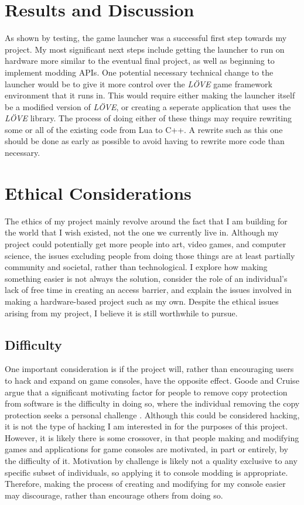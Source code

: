 \documentclass[10pt,twocolumn]{article}
\begin{document}
\section{Results and Discussion}

As shown by testing, the game launcher was a successful first step towards my
project. My most significant next steps include getting the launcher to run on
hardware more similar to the eventual final project, as well as beginning to
implement modding APIs. One potential necessary technical change to the launcher
would be to give it more control over the \textit{LÖVE}
game framework environment that
it runs in. This would require either making the launcher itself be a modified
version of
\textit{LÖVE}, or creating a seperate application that uses the \textit{LÖVE}
library.
The process of doing either of these things may require rewriting some or all of
the existing code from Lua to C++. A rewrite such as this one should be done as
early as possible to avoid having to rewrite more code than necessary.

\section{Ethical Considerations}

The ethics of my project mainly revolve around the fact that I am building
for the world that I wish existed, not the one we currently live in. Although my
project could potentially get more people into art, video games, and computer
science, the issues excluding people from doing those things are at least
partially community and societal, rather than technological.
I explore how making
something easier is not always the solution, consider the role of an
individual's lack of free time in creating an access barrier, and explain the
issues involved in making a hardware-based project such as my own. Despite the
ethical issues arising from my project, I believe it is still worthwhile to
pursue.

\subsection{Difficulty}

One important consideration is if the project will, rather than encouraging
users to hack and expand on game consoles, have the opposite effect.
Goode and Cruise argue that a significant motivating factor for people to remove
copy protection from software is the difficulty in doing so, where the
individual removing the copy protection seeks a personal challenge
\cite{goode_what_2006}. Although this could be considered hacking, it is not the
type of hacking I am interested in for the purposes of this project. However, it
is likely there is some crossover, in that people making and modifying games and
applications for game consoles are motivated, in part or entirely, by the
difficulty of it. Motivation by challenge is likely not a quality exclusive to
any specific subset of individuals, so applying it to console modding is
appropriate. Therefore, making the process of creating and modifying for my
console easier may discourage, rather than encourage others from doing so.
\end{document}
